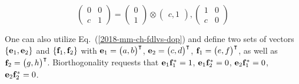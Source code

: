 {$$
\begin{pmatrix}
0&0 \\
c&1
\end{pmatrix}
=
\begin{pmatrix}
0 \\
1
\end{pmatrix}
\otimes
\begin{pmatrix}
c,1
\end{pmatrix},
\begin{pmatrix}
1&0 \\
c&0
\end{pmatrix}
$$

One can also utilize Eq.~(\ref{2018-mm-ch-fdlvs-dop}) and
define two sets of vectors
$\{ {\bf e}_1 , {\bf e}_2 \}$ and
$\{ {\bf f}_1 , {\bf f}_2 \}$
with
$ {\bf e}_1 =\begin{pmatrix} a,b\end{pmatrix}^\intercal$,
$ {\bf e}_2 =\begin{pmatrix} c,d\end{pmatrix}^\intercal$,
$ {\bf f}_1 =\begin{pmatrix} e,f\end{pmatrix}^\intercal$, as well as
$ {\bf f}_2 =\begin{pmatrix} g,h\end{pmatrix}^\intercal$.
Biorthogonality
requests that
${\bf e}_1 {\bf f}^\ast_1=1$,
${\bf e}_1 {\bf f}^\ast_2=0$,
${\bf e}_2 {\bf f}^\ast_1=0$,
${\bf e}_2 {\bf f}^\ast_2=0$.



%
%
%
%
%
%







}
